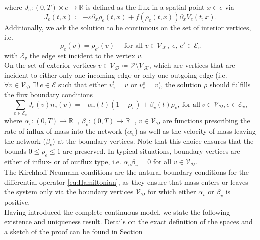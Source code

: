 where $J_e \colon (0,T) \times e \to \mathbb{R}$ is defined as the flux in a spatial point $x \in e$ via 
\begin{equation} 
    J_e(t,x) \coloneqq - \varepsilon \partial_x \rho_e (t, x) + f(\rho_e(t, x)) \partial_x V_e(t, x).
\end{equation}
Additionally, we ask the solution to be continuous on the set of interior vertices, i.e. 
\begin{equation}
    \label{continuous on vertices}
    \rho_e(v) = \rho_{e'}(v) \quad \text{ for all }v \in \mathcal{V}_\mathcal{K},\; e,\,e' \in \mathcal{E}_v
\end{equation}
with $\mathcal{E}_v$ the edge set incident to the vertex $v$. \\
On the set of exterior vertices $v \in \mathcal{V}_\mathcal{D} \coloneqq \mathcal{V} \setminus \mathcal{V}_\mathcal{K}$, which are vertices that are incident to either only one incoming edge or only one outgoing edge (i.e. $\forall v \in \mathcal{V}_\mathcal{D} \; \exists! \ e \in \mathcal{E}$ such that either $v^{t}_{e} = v$ or $v^{o}_{e} = v$), the solution $\rho$ should fulfills the flux boundary conditions
\begin{equation}
    \label{eq:Dirichlet_conditions}
    \sum_{e\in \mathcal{E}_v}J_e(v) n_e (v)=-\alpha_v(t) (1-\rho_v) + \beta_v(t) \rho_v,\ \text{for all}\ v \in \mathcal{V}_\mathcal{D}, e \in \mathcal{E}_v,
\end{equation}
where $\alpha_v \colon (0,T) \to \mathbb{R}_{+}, \, \beta_v \colon (0,T) \to \mathbb{R}_{+}$, ${v \in \mathcal{V}_\mathcal{D}}$ are functions prescribing the rate of influx of mass into the network ($\alpha_v$) as well as the velocity of mass leaving the network ($\beta_v$) at the boundary vertices. Note that this choice ensures that the bounds $0 \le \rho_e \le 1$ are preserved. In typical situations, boundary vertices are either of influx- or of outflux type, i.e. $\alpha_v \beta_v = 0$ for all $v \in \mathcal{V}_\mathcal{D}$. \\
The Kirchhoff-Neumann conditions are the natural boundary conditions for the differential operator \eqref{eq:Hamiltonian}, as they ensure that mass enters or leaves the system only via the boundary vertices $\mathcal{V}_\mathcal{D}$ for which either $\alpha_v$ or $\beta_v$ is positive. \\
Having introduced the complete continuous model, we state the following existence and uniqueness result. Details on the exact definition of the spaces and a sketch of the proof can be found in Section 


